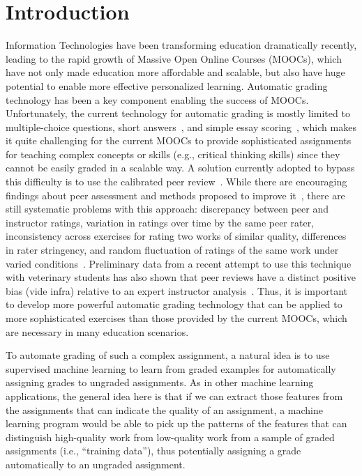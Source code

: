 \def\ignore#1{}
\section{Introduction}

Information Technologies have been transforming education dramatically
recently, leading to the rapid growth of Massive Open Online Courses
(MOOCs), which have not only made education more affordable and scalable,
but also have huge potential to enable more effective personalized
learning.  Automatic grading technology has been a key component enabling
the success of MOOCs. Unfortunately, the
current technology for automatic grading is mostly limited to multiple-choice
questions, short answers~\cite{Brooks:2014:Powergrading,
Leacock:2003:CatH, Mitchell:2002:ICAA, Pulman:2005:EdAppsNLP,
Mohler:2009:EACL}, and simple essay scoring~\cite{Chen:2014:IRRODL,
Balfour:2013}, which makes it quite challenging for the current MOOCs to
provide sophisticated assignments for teaching complex concepts or skills
(e.g., critical thinking skills) since they cannot be easily graded in a
scalable way. A solution currently adopted to bypass this difficulty is to
use the calibrated peer review~\cite{Balfour:2013, Chen:2014:IRRODL,
Sandeen:2013, Suen:2014}.  While there are encouraging findings about
peer assessment and methods proposed to improve it~\cite{Kulkarni:2013},
there are still systematic problems with this approach: discrepancy between
peer and instructor ratings, variation in ratings over time by the same
peer rater, inconsistency across exercises for rating two works of similar
quality, differences in rater stringency, and random fluctuation of ratings
of the same work under varied conditions~\cite{Suen:2014}. Preliminary data
from a recent attempt to use this technique with veterinary students has
also shown that peer reviews have a distinct positive bias (vide infra)
relative to an expert instructor analysis~\cite{Ferguson:2014}. Thus, it is
important to develop more powerful automatic grading technology that can be
applied to more sophisticated exercises than those provided by the current
MOOCs, which are necessary in many education scenarios.

To automate grading of such a complex assignment, a natural idea is to use
supervised machine learning to learn from graded examples for automatically
assigning grades to ungraded assignments. As in other machine learning
applications, the general idea here is that if we can extract those
features from the assignments that can indicate the quality of an
assignment, a machine learning program would be able to pick up the
patterns of the features that can distinguish high-quality work from
low-quality work from a sample of graded assignments (i.e., ``training
data''), thus potentially assigning a grade automatically to an ungraded
assignment.

